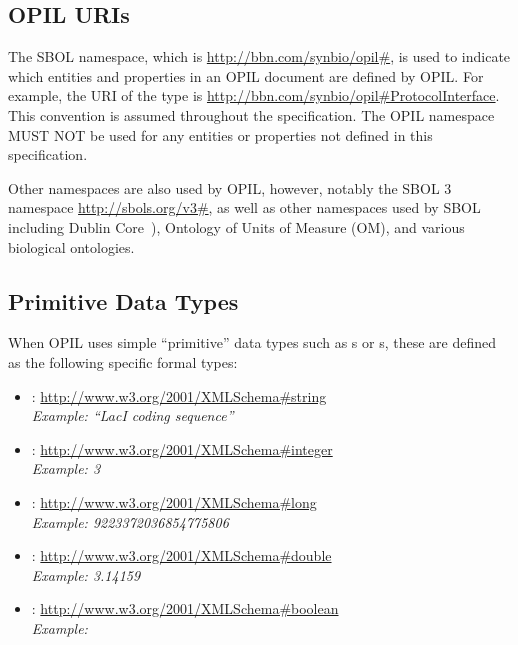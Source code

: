 \subsection{OPIL URIs}
 \label{sec:sbolURIs}
  
The SBOL namespace, which is \url{http://bbn.com/synbio/opil\#}, is used to indicate which entities and properties in an OPIL document are defined by OPIL. 
For example, the URI of the type  is \url{http://bbn.com/synbio/opil\#ProtocolInterface}. 
This convention is assumed throughout the specification.
The OPIL namespace MUST NOT be used for any entities or properties not defined in this specification.  

Other namespaces are also used by OPIL, however, notably the SBOL 3 namespace \url{http://sbols.org/v3\#}, as well as other namespaces used by SBOL including Dublin Core~\citep{dcmi2012}), Ontology of Units of Measure (OM), and various biological ontologies.


\subsection{Primitive Data Types}
\label{sec:datatypes}
\label{sec:String}
\label{sec:Integer}
\label{sec:Long}
\label{sec:Double}
\label{sec:Boolean}
\label{sec:URI}
\label{sec:literal}

When OPIL uses simple ``primitive'' data types such as s or s, these are defined as the following specific formal types:
\begin{itemize}
\item {}: \url{http://www.w3.org/2001/XMLSchema\#string}\\
  {\em Example: ``LacI coding sequence''}
\item {}: \url{http://www.w3.org/2001/XMLSchema\#integer}\\
  {\em Example: 3}
\item {}: \url{http://www.w3.org/2001/XMLSchema\#long}\\
  {\em Example: 9223372036854775806}
\item {}: \url{http://www.w3.org/2001/XMLSchema\#double}\\
  {\em Example: 3.14159}
\item {}: \url{http://www.w3.org/2001/XMLSchema\#boolean}\\
  {\em Example: }
\end{itemize}

